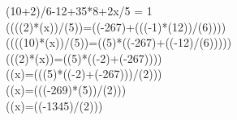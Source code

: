 (10+2)/6-12+35*8+2x/5 = 1\\
((((2)*(x))/(5))=((-267)+(((-1)*(12))/(6))))\\
((((10)*(x))/(5))=((5)*((-267)+((-12)/(6)))))\\
(((2)*(x))=((5)*((-2)+(-267))))\\
((x)=(((5)*((-2)+(-267)))/(2)))\\
((x)=(((-269)*(5))/(2)))\\
((x)=((-1345)/(2)))

